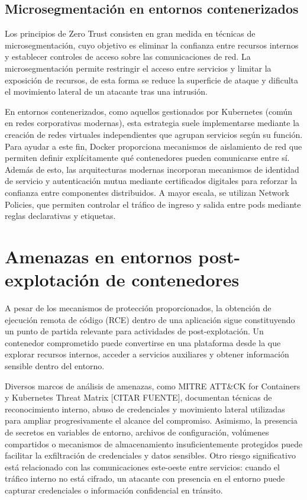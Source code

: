 \documentclass[11pt,spanish,listoffigures,listoftables]{tfgetsinf}
\begin{document}
        \subsection{Microsegmentación en entornos contenerizados}
        \label{sec:2.2.1}
        Los principios de Zero Trust consisten en gran medida en técnicas de microsegmentación, cuyo objetivo es eliminar la confianza entre recursos internos y establecer controles de acceso sobre las comunicaciones de red. La microsegmentación permite restringir el acceso entre servicios y limitar la exposición de recursos, de esta forma se reduce la superficie de ataque y dificulta el movimiento lateral de un atacante tras una intrusión.
        
        En entornos contenerizados, como aquellos gestionados por Kubernetes (común en redes corporativas modernas), esta estrategia suele implementarse mediante la creación de redes virtuales independientes que agrupan servicios según su función. Para ayudar a este fin, Docker proporciona mecanismos de aislamiento de red que permiten definir explícitamente qué contenedores pueden comunicarse entre sí. Además de esto, las arquitecturas modernas incorporan mecanismos de identidad de servicio y autenticación mutua mediante certificados digitales para reforzar la confianza entre componentes distribuidos. A mayor escala, se utilizan Network Policies, que permiten controlar el tráfico de ingreso y salida entre pods mediante reglas declarativas y etiquetas.

    \section{Amenazas en entornos post-explotación de contenedores}
    \label{sec:2.3}
    A pesar de los mecanismos de protección proporcionados, la obtención de ejecución remota de código (RCE) dentro de una aplicación sigue constituyendo un punto de partida relevante para actividades de post-explotación. Un contenedor comprometido puede convertirse en una plataforma desde la que explorar recursos internos, acceder a servicios auxiliares y obtener información sensible dentro del entorno.
    
    Diversos marcos de análisis de amenazas, como MITRE ATT\&CK for Containers y Kubernetes Threat Matrix [CITAR FUENTE], documentan técnicas de reconocimiento interno, abuso de credenciales y movimiento lateral utilizadas para ampliar progresivamente el alcance del compromiso. Asimismo, la presencia de secretos en variables de entorno, archivos de configuración, volúmenes compartidos o mecanismos de almacenamiento insuficientemente protegidos puede facilitar la exfiltración de credenciales y datos sensibles. Otro riesgo significativo está relacionado con las comunicaciones este-oeste entre servicios: cuando el tráfico interno no está cifrado, un atacante con presencia en el entorno puede capturar credenciales o información confidencial en tránsito.
    
\end{document}
